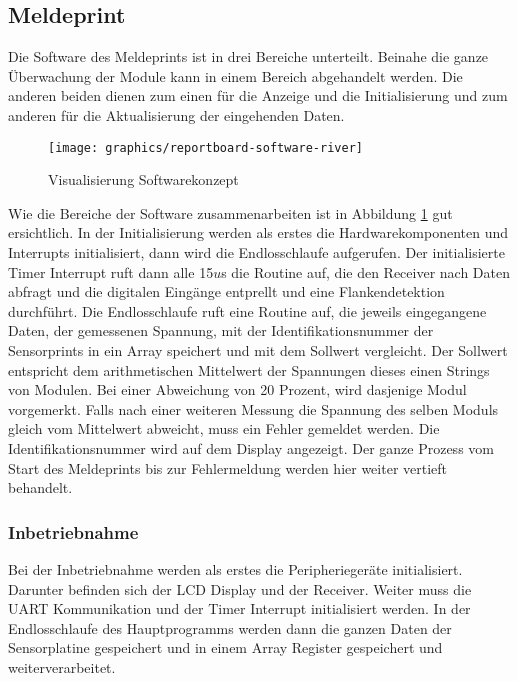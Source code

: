 
\subsection{Meldeprint}
Die Software des Meldeprints ist in drei Bereiche unterteilt. Beinahe die ganze Überwachung der Module kann in einem Bereich abgehandelt werden. Die anderen beiden dienen zum einen für die Anzeige und die Initialisierung und zum anderen für die Aktualisierung der eingehenden Daten.

\begin{figure}[htbp] 
  \centering
     \texttt{[image: graphics/reportboard-software-river]}
  \caption{Visualisierung Softwarekonzept}
  \label{fig:reportboard-software-river}
\end{figure}

Wie die Bereiche der Software zusammenarbeiten ist in Abbildung \ref{fig:reportboard-software-river} gut ersichtlich. In der Initialisierung werden als erstes die Hardwarekomponenten und Interrupts initialisiert, dann wird die Endlosschlaufe aufgerufen.
\newline
Der initialisierte Timer Interrupt ruft dann alle 15$u$s die Routine auf, die den Receiver nach Daten abfragt und die digitalen Eingänge entprellt und eine Flankendetektion durchführt.
\newline
Die Endlosschlaufe ruft eine Routine auf, die jeweils eingegangene Daten, der gemessenen Spannung, mit der Identifikationsnummer der Sensorprints in ein Array speichert und mit dem Sollwert vergleicht. Der Sollwert entspricht dem arithmetischen Mittelwert der Spannungen dieses einen Strings von Modulen. Bei einer Abweichung von 20 Prozent, wird dasjenige Modul vorgemerkt. Falls nach einer weiteren Messung die Spannung des selben Moduls gleich vom Mittelwert abweicht, muss ein Fehler gemeldet werden. Die Identifikationsnummer wird auf dem Display angezeigt. Der ganze Prozess vom Start des Meldeprints bis zur Fehlermeldung werden hier weiter vertieft behandelt.

\subsubsection{Inbetriebnahme}
Bei der Inbetriebnahme werden als erstes die Peripheriegeräte initialisiert. Darunter befinden sich der LCD Display und der Receiver. Weiter muss die UART Kommunikation und der Timer Interrupt initialisiert werden. In der Endlosschlaufe des Hauptprogramms werden dann die ganzen Daten der Sensorplatine gespeichert und in einem Array Register gespeichert und weiterverarbeitet.

